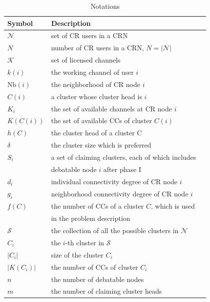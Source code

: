 \documentclass[times]{ettauth}
\theoremstyle{mytheoremstyle}
\theoremstyle{mytheoremstyle}
\theoremstyle{mytheoremstyle}
\begin{document}
\begin{table}[h!]
\caption{Notations}
\label{tab1}
\centering
\begin{tabular}{llr}
\toprule
Symbol & Description \\
\midrule
$\mathcal{N}$  & set of CR users in a CRN\\
$N$ & number of CR users in a CRN, $N=|\mathcal{N}|$\\
$\mathcal{K}$	& set of licensed channels\\
$k(i)$ & the working channel of user $i$\\
$\text{Nb}(i)$ & the neighborhood of CR node $i$    \\
$C(i)$ & a cluster whose cluster head is $i$  \\
$K_i$   & the set of available channels at CR node $i$  \\
$K(C(i))$   & the set of available CCs of cluster $C(i)$ \\
$h(C)$ & the cluster head of a cluster C\\
$\delta$ & the cluster size which is preferred\\
$S_i$ & a set of claiming clusters, each of which includes \\
& debatable node $i$ after phase I\\
$d_i$  & individual connectivity degree of CR node $i$\\
$g_i$  & neighborhood connectivity degree of CR node $i$\\
$f(C)$ & the number of CCs of a cluster $C$, which is used \\
& in the problem description\\
 $\mathcal{S}$ & the collection of all the possible clusters in $\mathcal{N}$\\
 $C_i$  & the $i$-th cluster in $\mathcal{S}$ \\
 $|C_i|$ & size of the cluster $C_i$\\
 $|K(C_i)|$ & the number of CCs of cluster $C_i$\\
 $n$ & the number of debatable nodes\\
 $m$ & the number of claiming cluster heads\\
\bottomrule
\end{tabular}
\end{table}
\end{document}
